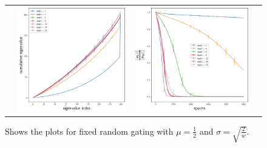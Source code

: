 \begin{figure}[h]
{\begin{tabular}{cccc}
&
\includegraphics[scale=0.5]{figs/dgn-fra-ecdfbyd-w500.png}
&
\includegraphics[scale=0.5]{figs/dgn-fra-conv-w500.png}
\end{tabular}
}
\caption{Shows the plots for fixed random gating with $\mu=\frac{1}{2}$ and $\sigma=\sqrt{\frac{2}{w}}$. }
\label{fig:dgn-frg-gram-ecdf}
\end{figure}

